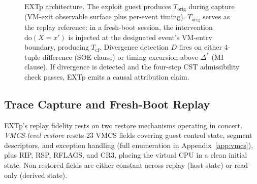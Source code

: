 \documentclass[conference]{IEEEtran}
\newcommand{\Korig}{T_\text{orig}}
\newcommand{\Tcf}{T_\text{cf}}
\newcommand{\Dstar}{\Delta^{*}}
\newcommand{\dox}[1]{\text{do}(X{=}#1)}
\begin{document}
\begin{figure}[tb]
{%
  }
  \caption{EXTp architecture. The exploit guest produces $\Korig$
    during capture (VM-exit observable surface plus per-event
    timing). $\Korig$ serves as the replay reference: in a fresh-boot
    session, the intervention $\dox{x'}$ is injected at the
    designated event's VM-entry boundary, producing $\Tcf$. Divergence
    detection $D$ fires on either 4-tuple difference (SOE clause) or
    timing excursion above $\Dstar$ (MI clause). If divergence is
    detected and the four-step CST admissibility check passes, EXTp
    emits a causal attribution claim.}
  \label{fig:arch}
\end{figure}

\subsection{Trace Capture and Fresh-Boot Replay}

EXTp's replay fidelity rests on two restore mechanisms operating in
concert. \emph{VMCS-level restore} resets 23 VMCS fields covering
guest control state, segment descriptors, and exception handling
(full enumeration in Appendix~\ref{app:vmcs}), plus RIP, RSP, RFLAGS,
and CR3, placing the virtual CPU in a clean initial state.
Non-restored fields are either constant across replay (host state)
or read-only (derived state).
\end{document}
